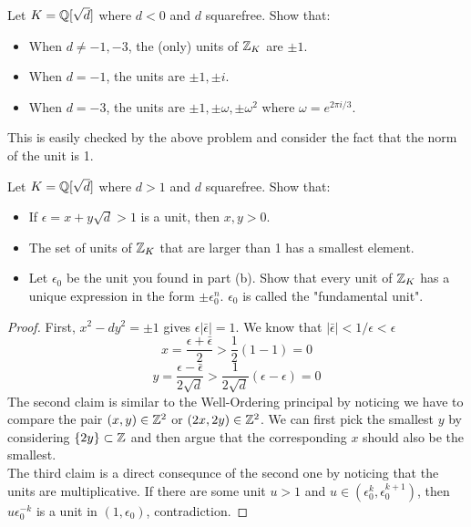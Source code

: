 \documentclass[12pt,twoside=semi,openright,numbers=noenddot]{scrbook}
\begin{document}
\begin{problem}
    Let $K = \mathbb Q[\sqrt{d}]$ where $d < 0$ and $d$ squarefree. 
    Show that: 
    \begin{itemize}
        \item When $d \neq -1, -3$, the (only) units of $\mathbb Z_K$ are $\pm 1$.
        \item When $d = -1$, the units are $\pm 1, \pm i$.
        \item When $d = -3$, the units are $\pm 1, \pm \omega, \pm \omega^2$ where $\omega = e^{2\pi i/3}$.
    \end{itemize}
\end{problem}
    This is easily checked by the above problem and consider the fact that the norm of the unit is 1.

\begin{problem}
    Let $K = \mathbb Q[\sqrt{d}]$ where $d >1$ and $d$ squarefree. 
    Show that: 
    \begin{itemize}
        \item If $\epsilon = x+y\sqrt{d} > 1$ is a unit, then $x, y > 0$.
        \item The set of units of $\mathbb Z_K$ that are larger than 1 has a smallest element.
        \item Let $\epsilon_0$ be the unit you found in part (b). Show that every unit of $\mathbb Z_K$ has a unique expression in the form $\pm \epsilon_0^n$.
        $\epsilon_0$ is called the "fundamental unit".
    \end{itemize}
\end{problem}
    \begin{proof}
        First, $x^2-dy^2 = \pm 1$ gives $\epsilon|\bar{\epsilon}| = 1$. We know that $|\bar{\epsilon}| < 1/\epsilon < \epsilon$
        $$ x = \frac{\epsilon + \bar{\epsilon}}{2} > \frac{1}{2}(1-1) = 0$$
        $$ y = \frac{\epsilon - \bar{\epsilon}}{2\sqrt{d}} > \frac{1}{2\sqrt{d}}(\epsilon-\epsilon) = 0$$
        The second claim is similar to the Well-Ordering principal by noticing we have to compare the pair $(x,y) \in \mathbb Z^2$ or $(2x, 2y) \in \mathbb Z^2$. We can first pick the smallest $y$
        by considering $\{2y\} \subset \mathbb Z$ and then argue that the corresponding $x$ should also be the smallest. \\
        The third claim is a direct consequnce of the second one by noticing that the units are multiplicative. If there are some unit $u > 1$ and $u \in (\epsilon_0^k, \epsilon_0^{k+1})$, 
        then $u\epsilon_0^{-k}$ is a unit in $(1, \epsilon_0)$, contradiction.
    \end{proof}
\end{document}
